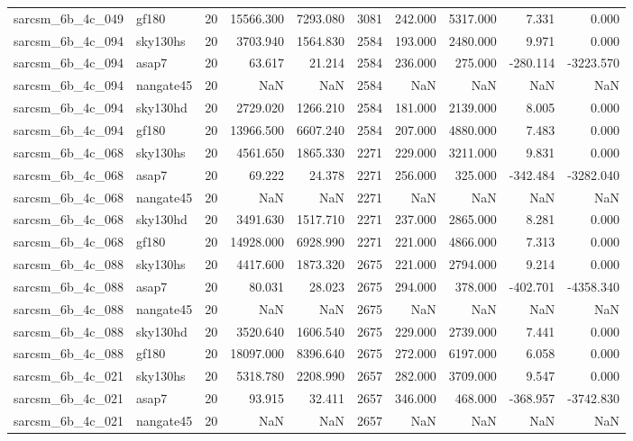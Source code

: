 \begin{longtable}{llrrrrrrrr}
sarcsm\_6b\_4c\_049 & gf180 & 20 & 15566.300 & 7293.080 & 3081 & 242.000 & 5317.000 & 7.331 & 0.000 \\
sarcsm\_6b\_4c\_094 & sky130hs & 20 & 3703.940 & 1564.830 & 2584 & 193.000 & 2480.000 & 9.971 & 0.000 \\
sarcsm\_6b\_4c\_094 & asap7 & 20 & 63.617 & 21.214 & 2584 & 236.000 & 275.000 & -280.114 & -3223.570 \\
sarcsm\_6b\_4c\_094 & nangate45 & 20 & NaN & NaN & 2584 & NaN & NaN & NaN & NaN \\
sarcsm\_6b\_4c\_094 & sky130hd & 20 & 2729.020 & 1266.210 & 2584 & 181.000 & 2139.000 & 8.005 & 0.000 \\
sarcsm\_6b\_4c\_094 & gf180 & 20 & 13966.500 & 6607.240 & 2584 & 207.000 & 4880.000 & 7.483 & 0.000 \\
sarcsm\_6b\_4c\_068 & sky130hs & 20 & 4561.650 & 1865.330 & 2271 & 229.000 & 3211.000 & 9.831 & 0.000 \\
sarcsm\_6b\_4c\_068 & asap7 & 20 & 69.222 & 24.378 & 2271 & 256.000 & 325.000 & -342.484 & -3282.040 \\
sarcsm\_6b\_4c\_068 & nangate45 & 20 & NaN & NaN & 2271 & NaN & NaN & NaN & NaN \\
sarcsm\_6b\_4c\_068 & sky130hd & 20 & 3491.630 & 1517.710 & 2271 & 237.000 & 2865.000 & 8.281 & 0.000 \\
sarcsm\_6b\_4c\_068 & gf180 & 20 & 14928.000 & 6928.990 & 2271 & 221.000 & 4866.000 & 7.313 & 0.000 \\
sarcsm\_6b\_4c\_088 & sky130hs & 20 & 4417.600 & 1873.320 & 2675 & 221.000 & 2794.000 & 9.214 & 0.000 \\
sarcsm\_6b\_4c\_088 & asap7 & 20 & 80.031 & 28.023 & 2675 & 294.000 & 378.000 & -402.701 & -4358.340 \\
sarcsm\_6b\_4c\_088 & nangate45 & 20 & NaN & NaN & 2675 & NaN & NaN & NaN & NaN \\
sarcsm\_6b\_4c\_088 & sky130hd & 20 & 3520.640 & 1606.540 & 2675 & 229.000 & 2739.000 & 7.441 & 0.000 \\
sarcsm\_6b\_4c\_088 & gf180 & 20 & 18097.000 & 8396.640 & 2675 & 272.000 & 6197.000 & 6.058 & 0.000 \\
sarcsm\_6b\_4c\_021 & sky130hs & 20 & 5318.780 & 2208.990 & 2657 & 282.000 & 3709.000 & 9.547 & 0.000 \\
sarcsm\_6b\_4c\_021 & asap7 & 20 & 93.915 & 32.411 & 2657 & 346.000 & 468.000 & -368.957 & -3742.830 \\
sarcsm\_6b\_4c\_021 & nangate45 & 20 & NaN & NaN & 2657 & NaN & NaN & NaN & NaN \\

\end{longtable}
